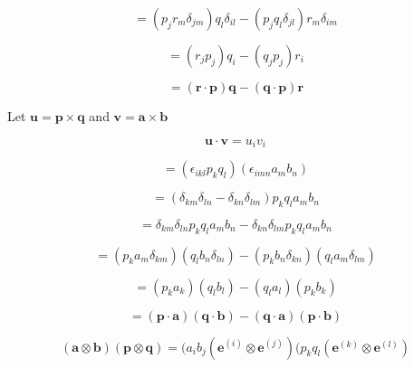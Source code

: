 \documentclass{article}
\begin{document}
\begin{equation*}
    = (p_j r_m \delta_{jm}) q_l \delta_{il} - (p_j q_l \delta_{jl}) r_m \delta_{im}
\end{equation*}

\begin{equation*}
    = (r_j p_j) q_i - (q_j p_j) r_i
\end{equation*}

\begin{equation*}
    = (\bm{r} \cdot \bm{p}) \bm{q} - (\bm{q} \cdot \bm{p}) \bm{r}
\end{equation*}

\newpage


Let $\bm{u} = \bm{p} \times \bm{q}$ and $\bm{v} = \bm{a} \times \bm{b}$

\begin{equation*}
    \bm{u} \cdot \bm{v} = u_i v_i
\end{equation*}

\begin{equation*}
    = (\epsilon_{ikl} p_k q_l) (\epsilon_{imn} a_m b_n)
\end{equation*}

\begin{equation*}
    = (\delta_{km} \delta_{ln} - \delta_{kn} \delta_{lm}) p_k q_l a_m b_n
\end{equation*}

\begin{equation*}
    = \delta_{km} \delta_{ln} p_k q_l a_m b_n - \delta_{kn} \delta_{lm} p_k q_l a_m b_n
\end{equation*}

\begin{equation*}
    = (p_k a_m \delta_{km}) (q_l b_n \delta_{ln}) - (p_k b_n \delta_{kn}) (q_l a_m \delta_{lm})
\end{equation*}

\begin{equation*}
    = (p_k a_k)(q_l b_l) - (q_l a_l)(p_k b_k)
\end{equation*}

\begin{equation*}
    = (\bm{p} \cdot \bm{a}) (\bm{q} \cdot \bm{b}) - (\bm{q} \cdot \bm{a})(\bm{p} \cdot \bm{b})
\end{equation*}

\newpage


\begin{equation*}
    (\bm{a} \otimes \bm{b})(\bm{p} \otimes \bm{q}) = (a_i b_j(\bm{e}^{(i)} \otimes \bm{e}^{(j)})(p_k q_l(\bm{e}^{(k)} \otimes \bm{e}^{(l)})
\end{equation*}
\end{document}
